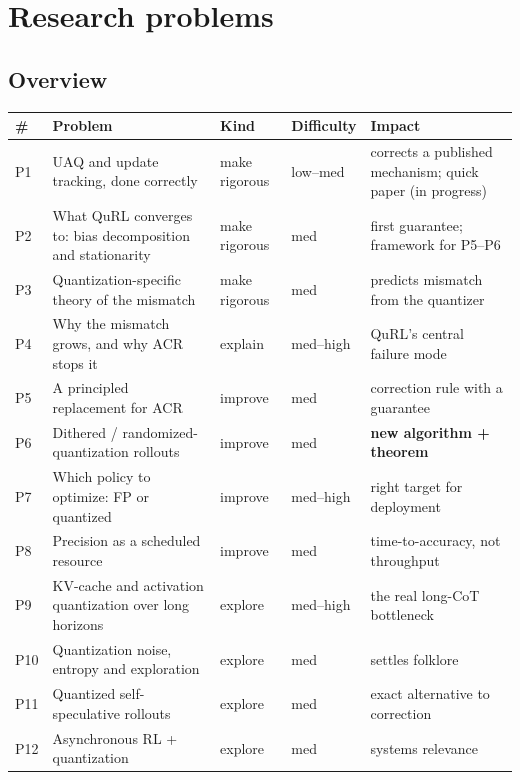 \documentclass[11pt]{article}
\begin{document}
\section{Research problems}\label{sec:problems}

\subsection{Overview}
\begin{center}\small
\begin{tabularx}{\linewidth}{@{}l L l l L@{}}
\toprule
\# & Problem & Kind & Difficulty & Impact\\
\midrule
P1 & UAQ and update tracking, done correctly & make rigorous & low--med & corrects a published mechanism; quick paper (in progress)\\
P2 & What QuRL converges to: bias decomposition and stationarity & make rigorous & med & first guarantee; framework for P5--P6\\
P3 & Quantization-specific theory of the mismatch & make rigorous & med & predicts mismatch from the quantizer\\
P4 & Why the mismatch grows, and why ACR stops it & explain & med--high & QuRL's central failure mode\\
P5 & A principled replacement for ACR & improve & med & correction rule with a guarantee\\
P6 & Dithered / randomized-quantization rollouts & improve & med & \textbf{new algorithm + theorem}\\
P7 & Which policy to optimize: FP or quantized & improve & med--high & right target for deployment\\
P8 & Precision as a scheduled resource & improve & med & time-to-accuracy, not throughput\\
P9 & KV-cache and activation quantization over long horizons & explore & med--high & the real long-CoT bottleneck\\
P10 & Quantization noise, entropy and exploration & explore & med & settles folklore\\
P11 & Quantized self-speculative rollouts & explore & med & exact alternative to correction\\
P12 & Asynchronous RL + quantization & explore & med & systems relevance\\
\bottomrule
\end{tabularx}
\end{center}
\end{document}
